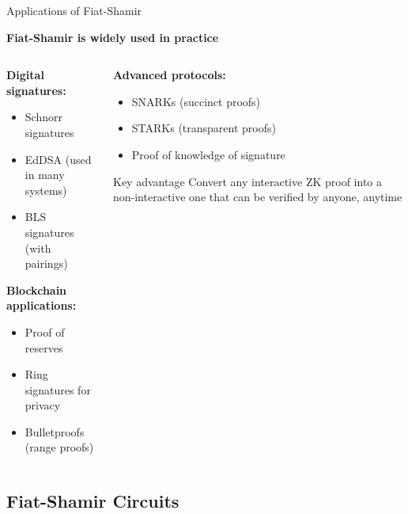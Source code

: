 \documentclass[aspectratio=169, lualatex, handout]{beamer}
\begin{document}
\begin{frame}{Applications of Fiat-Shamir}
	\begin{center}
		\textbf{Fiat-Shamir is widely used in practice}
	\end{center}
	\vspace{0.5em}
	\begin{columns}[c]
		\begin{column}{0.5\textwidth}
			\textbf{Digital signatures:}
			\begin{itemize}
				\item Schnorr signatures
				\item EdDSA (used in many systems)
				\item BLS signatures (with pairings)
			\end{itemize}
			\vspace{0.5em}
			\textbf{Blockchain applications:}
			\begin{itemize}
				\item Proof of reserves
				\item Ring signatures for privacy
				\item Bulletproofs (range proofs)
			\end{itemize}
		\end{column}
		\begin{column}{0.5\textwidth}
			\textbf{Advanced protocols:}
			\begin{itemize}
				\item SNARKs (succinct proofs)
				\item STARKs (transparent proofs)
				\item Proof of knowledge of signature
			\end{itemize}
			\vspace{0.5em}
			\begin{alertblock}{Key advantage}
				Convert any interactive ZK proof into a non-interactive one that can be verified by anyone, anytime
			\end{alertblock}
		\end{column}
	\end{columns}
\end{frame}

\subsection{Fiat-Shamir Circuits}
\end{document}
